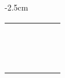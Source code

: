 \begin{center}
\begin{adjustwidth}{-2.5cm}{}
\begin{tabular}{|c c c c c c|}
             &  &  &  &  &  \\
             &  &  &  &  &  \\
             &  &  &  &  &  \\
             &  &  &  &  &  \\
             &  &  &  &  &  \\
             &  &  &  &  &  \\
             &  &  &  &  &  \\
             &  &  &  &  &  \\
             &  &  &  &  &  \\
             &  &  &  &  &  \\
             &  &  &  &  &  \\
             &  &  &  &  &  \\
             &  &  &  &  &  \\
             &  &  &  &  &  \\
            \hline
        \end{tabular}
    \end{adjustwidth}
\end{center}


